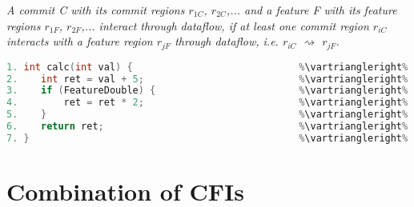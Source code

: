 \begin{definition}\label{def:dataflow_cfi}
\emph{A commit C with its commit regions $r_{1C}$, $r_{2C}$,... and a feature F with its feature regions $r_{1F}$, $r_{2F}$,... interact through dataflow, if at least one commit region $r_{iC}$ interacts with a feature region $r_{jF}$ through dataflow, i.e. $r_{iC}$ $\rightsquigarrow$ $r_{jF}$.}
\end{definition}

\begin{lstlisting}[language=C++, caption={This code example contains both structural as well as dataflow-based commit feature interactions.
Commit \texttt{fc3a17d} implements the functionality of \texttt{FeatureDouble} for this function.
It follows that a structural commit-feature interaction can be found between them, as their respective commit and feature regions structurally interact.
Commit \texttt{7edb283} introduces the variable \texttt{ret} that is later used inside the feature region of \texttt{FeatureDouble}. 
This accounts for a commit-feature interaction through dataflow, as data that was produced within a commit region is used as input 
by an instruction belonging to a feature region of \texttt{FeatureDouble} later on in the program.}, label=DescriptiveLabel]	
1. int calc(int val) {                             %\vartriangleright% %\texttt{d93df4a}%
2.    int ret = val + 5;                           %\vartriangleright% %\texttt{7edb283}%
3.    if (FeatureDouble) {                         %\vartriangleright% %\texttt{fc3a17d}%    %\vartriangleright% %FeatureDouble%
4.        ret = ret * 2;                           %\vartriangleright% %\texttt{fc3a17d}%    %\vartriangleright% %FeatureDouble%
5.    }                                            %\vartriangleright% %\texttt{fc3a17d}%    %\vartriangleright% %FeatureDouble%
6.    return ret;                                  %\vartriangleright% %\texttt{d93df4a}%   
7. }                                               %\vartriangleright% %\texttt{d93df4a}%   
\end{lstlisting}

\section{Combination of CFIs}\label{sec:combination_cfis}


